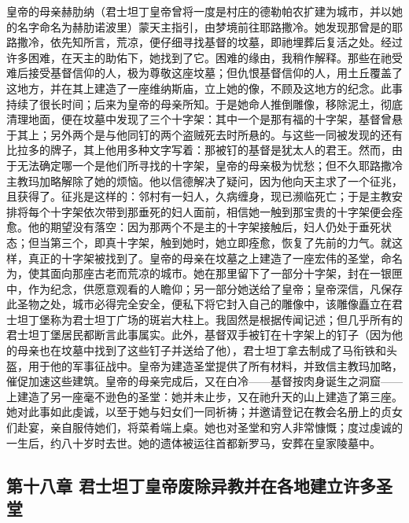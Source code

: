 皇帝的母亲赫肋纳（君士坦丁皇帝曾将一度是村庄的德勒帕农扩建为城市，并以她的名字命名为赫肋诺波里）蒙天主指引，由梦境前往耶路撒冷。她发现那曾是的耶路撒冷，依先知所言，荒凉，便仔细寻找基督的坟墓，即祂埋葬后复活之处。经过许多困难，在天主的助佑下，她找到了它。困难的缘由，我稍作解释。那些在祂受难后接受基督信仰的人，极为尊敬这座坟墓；但仇恨基督信仰的人，用土丘覆盖了这地方，并在其上建造了一座维纳斯庙，立上她的像，不顾及这地方的纪念。此事持续了很长时间；后来为皇帝的母亲所知。于是她命人推倒雕像，移除泥土，彻底清理地面，便在坟墓中发现了三个十字架：其中一个是那有福的十字架，基督曾悬于其上；另外两个是与他同钉的两个盗贼死去时所悬的。与这些一同被发现的还有比拉多的牌子，其上他用多种文字写着：那被钉的基督是犹太人的君王。然而，由于无法确定哪一个是他们所寻找的十字架，皇帝的母亲极为忧愁；但不久耶路撒冷主教玛加略解除了她的烦恼。他以信德解决了疑问，因为他向天主求了一个征兆，且获得了。征兆是这样的：邻村有一妇人，久病缠身，现已濒临死亡；于是主教安排将每个十字架依次带到那垂死的妇人面前，相信她一触到那宝贵的十字架便会痊愈。他的期望没有落空：因为那两个不是主的十字架接触后，妇人仍处于垂死状态；但当第三个，即真十字架，触到她时，她立即痊愈，恢复了先前的力气。就这样，真正的十字架被找到了。皇帝的母亲在坟墓之上建造了一座宏伟的圣堂，命名为，使其面向那座古老而荒凉的城市。她在那里留下了一部分十字架，封在一银匣中，作为纪念，供愿意观看的人瞻仰；另一部分她送给了皇帝；皇帝深信，凡保存此圣物之处，城市必得完全安全，便私下将它封入自己的雕像中，该雕像矗立在君士坦丁堡称为君士坦丁广场的斑岩大柱上。我固然是根据传闻记述；但几乎所有的君士坦丁堡居民都断言此事属实。此外，基督双手被钉在十字架上的钉子（因为他的母亲也在坟墓中找到了这些钉子并送给了他），君士坦丁拿去制成了马衔铁和头盔，用于他的军事征战中。皇帝为建造圣堂提供了所有材料，并致信主教玛加略，催促加速这些建筑。皇帝的母亲完成后，又在白冷——基督按肉身诞生之洞窟——上建造了另一座毫不逊色的圣堂：她并未止步，又在祂升天的山上建造了第三座。她对此事如此虔诚，以至于她与妇女们一同祈祷；并邀请登记在教会名册上的贞女们赴宴，亲自服侍她们，将菜肴端上桌。她也对圣堂和穷人非常慷慨；度过虔诚的一生后，约八十岁时去世。她的遗体被运往首都新罗马，安葬在皇家陵墓中。\par


\subsection{第十八章 君士坦丁皇帝废除异教并在各地建立许多圣堂}

